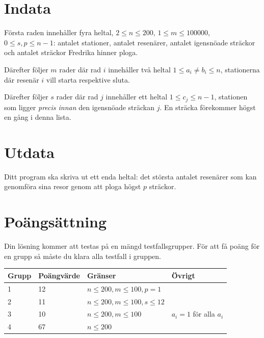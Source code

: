 \section*{Indata}
Första raden innehåller fyra heltal, $2 \le n \le 200$, $ 1 \le m \le 100000 $, $ 0 \le s, p \le n - 1$: antalet stationer, antalet resenärer, antalet igensnöade sträckor och antalet sträckor Fredrika hinner ploga.

Därefter följer $m$ rader där rad $i$ innehåller två heltal $1 \le a_i \not= b_i \le n$, stationerna där resenär $i$ vill starta respektive sluta.

Därefter följer $s$ rader där rad $j$ innehåller ett heltal $ 1 \le c_j \le n - 1$, stationen som ligger \emph{precis innan} den igensnöade sträckan $j$.
En sträcka förekommer högst en gång i denna lista.


\section*{Utdata}
Ditt program ska skriva ut ett enda heltal: det största antalet resenärer som kan genomföra sina resor genom att ploga högst $p$ sträckor.

\section*{Poängsättning}
Din lösning kommer att testas på en mängd testfallsgrupper. För att få poäng för en grupp så måste du klara alla testfall i gruppen.

\begin{tabular}{| l | l | l | l |}
\hline
Grupp & Poängvärde & Gränser & Övrigt \\ \hline
1     & 12         & $ n \le 200, m \le 100, p = 1$ &\\ \hline
2     & 11         & $ n \le 200, m \le 100, s \le 12 $ &\\ \hline
3     & 10          & $ n \le 200, m \le 100$ & $a_i = 1$ för alla $a_i$\\ \hline
4     & 67         & $ n \le 200$ &\\ \hline
\end{tabular}
